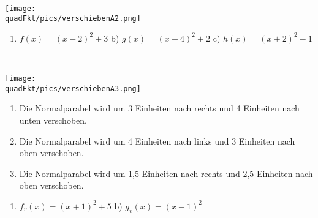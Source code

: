 \begin{Answer}[ref=verschiebenA2]\\
	\begin{minipage}{\linewidth}\centering
		\texttt{[image: \\quadFkt/pics/verschiebenA2.png]}
	\end{minipage}\vspace{.1cm}
	\begin{enumerate}[label=\alph*)]
		\item $f(x)=\left(x-2\right)^2+3$ \quad b) $g(x)=\left(x+4\right)^2+2$ \quad c) $h(x)=\left(x+2\right)^2-1$
	\end{enumerate}
\end{Answer}
\begin{Answer}[ref=verschiebenA3]\\
	\begin{minipage}{\linewidth}\centering
		\texttt{[image: \\quadFkt/pics/verschiebenA3.png]}
	\end{minipage}\vspace{.1cm}
	\begin{enumerate}[label=\alph*)]
		\item Die Normalparabel wird um 3 Einheiten nach rechts und 4 Einheiten nach unten verschoben.
		\item Die Normalparabel wird um 4 Einheiten nach links und 3 Einheiten nach oben verschoben.
		\item Die Normalparabel wird um 1,5 Einheiten nach rechts und 2,5 Einheiten nach oben verschoben.
	\end{enumerate}
\end{Answer}
\begin{Answer}[ref=verschiebenA4]
	\begin{enumerate}[label=\alph*)]
		\item $f_v(x)=(x+1)^2+5$ \quad b) $g_v(x)=(x-1)^2$
	\end{enumerate}
\end{Answer}\newpage
